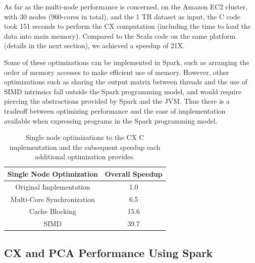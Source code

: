         As far as the multi-node performance is concerned, 
 on the Amazon EC2 cluster, with 30 nodes (960-cores in total), and
 the 1 TB dataset as input, the C code
 took 151 seconds to perform the CX computation (including the time to load
 the data into main memory). 
 Compared to the Scala code on the same platform (details in the
 next section), we achieved a speedup of 21X.

 Some of these optimizations can be implemented in Spark, such as arranging the
 order of memory accesses to make efficient use of memory. %
 However, other optimizations such as sharing the output matrix between threads
 and the use of SIMD intrinsics fall outside the Spark programming model, and would
 require piercing the abstractions provided by Spark and the JVM.
 Thus there is a tradeoff between optimizing performance 
 and the ease of implementation %
 available when expressing programs in the Spark programming model.

 
  \begin{table}
  \begin{center}
  \begin{tabular}{ |c|c| } 
  \hline
  Single Node Optimization & Overall Speedup\\
  \hline
  Original Implementation & 1.0  \\
  Multi-Core Synchronization & 6.5 \\
  Cache Blocking & 15.6 \\
  SIMD & 39.7 \\
  \hline

  \end{tabular}
  \end{center}
  \caption{Single node optimizations to the CX C implementation and
    the subsequent speedup each additional optimization provides.}
  \label{tab:single_node}
  \end{table}
 



  \subsection{CX and PCA Performance Using Spark} %

